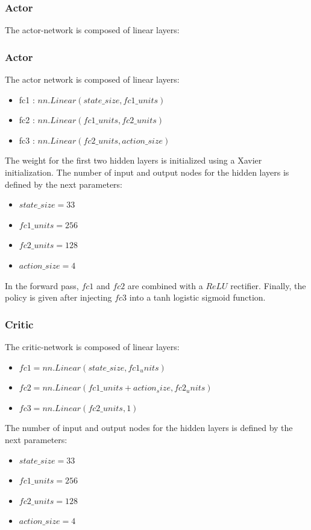 \documentclass[12pt]{article}
\begin{document}
\subsubsection{Actor}
The actor-network is composed of linear layers:

\subsubsection{Actor}
The actor network is composed of linear layers:
\begin{itemize}
\item fc1 : $nn.Linear(state\_size, fc1\_units)$
\item fc2 : $nn.Linear(fc1\_units, fc2\_units)$
\item fc3 : $nn.Linear(fc2\_units, action\_size)$
\end{itemize}

The weight for the first two hidden layers is initialized using a Xavier initialization.
The number of input and output nodes for the hidden layers is defined by the next parameters:

\begin{itemize}
\item $state\_size=33$
\item $fc1\_units=256$
\item $fc2\_units=128$
\item $action\_size=4$
\end{itemize}

In the forward pass, $fc1$ and $fc2$ are combined with a $ReLU$ rectifier. Finally, the policy is given after injecting $fc3$ into a tanh logistic sigmoid function.

\subsubsection{Critic}
The critic-network is composed of linear layers:

\begin{itemize}
\item $fc1 = nn.Linear(state\_size, fc1_units)$
\item $fc2 = nn.Linear(fc1\_units+action_size, fc2_units)$
\item $fc3 = nn.Linear(fc2\_units, 1)$
\end{itemize}
The number of input and output nodes for the hidden layers is defined by the next parameters:

\begin{itemize}
\item $state\_size=33$
\item $fc1\_units=256$
\item $fc2\_units=128$
\item $action\_size=4$
\end{itemize}
\end{document}
